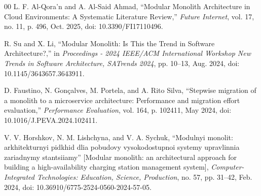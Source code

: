 \documentclass[10pt,conference]{IEEEtran}
\begin{document}
\begin{thebibliography}{00}
 L. F. Al-Qora'n and A. Al-Said Ahmad, ``Modular Monolith Architecture in Cloud Environments: A Systematic Literature Review,'' \textit{Future Internet}, vol. 17, no. 11, p. 496, Oct. 2025, doi: 10.3390/FI17110496.

 R. Su and X. Li, ``Modular Monolith: Is This the Trend in Software Architecture?,'' in \textit{Proceedings - 2024 IEEE/ACM International Workshop New Trends in Software Architecture, SATrends 2024}, pp. 10--13, Aug. 2024, doi: 10.1145/3643657.3643911.

 D. Faustino, N. Gonçalves, M. Portela, and A. Rito Silva, ``Stepwise migration of a monolith to a microservice architecture: Performance and migration effort evaluation,'' \textit{Performance Evaluation}, vol. 164, p. 102411, May 2024, doi: 10.1016/J.PEVA.2024.102411.

 V. V. Horshkov, N. M. Lishchyna, and V. A. Sychuk, ``Modulnyi monolit: arkhitekturnyi pidkhid dlia pobudovy vysokodostupnoi systemy upravlinnia zariadnymy stantsiiamy'' [Modular monolith: an architectural approach for building a high-availability charging station management system], \textit{Computer-Integrated Technologies: Education, Science, Production}, no. 57, pp. 31--42, Feb. 2024, doi: 10.36910/6775-2524-0560-2024-57-05.

\end{thebibliography}
\end{document}
